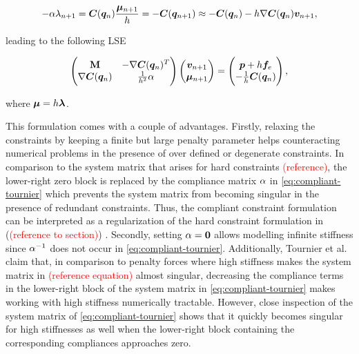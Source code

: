 \[
    -\mathbf{\alpha\lambda}_{n+1} = \bm{C}(\bm{q}_n)\frac{\bm{\mu}_{n+1}}{h} = -\bm{C}(\bm{q}_{n+1}) \approx -\bm{C}(\bm{q}_n) - h\nabla 
    \bm{C}(\bm{q}_n) \bm{v}_{n+1},
\]

\noindent leading to the following LSE \cite{tournier2015}

\begin{equation}\label{eq:compliant-tournier}
\begin{pmatrix}
    \mathbf{M} & -\nabla \bm{C}(\bm{q}_n)^T \\
    \nabla \bm{C}(\bm{q}_n) & \frac{1}{h^2}\mathbf{\alpha}
\end{pmatrix}
\begin{pmatrix}
    \bm{v}_{n+1} \\
    \bm{\mu}_{n+1}
\end{pmatrix}
=
\begin{pmatrix}
    \bm{p} + h\bm{f}_e \\
    - \frac{1}{h}\bm{C}(\bm{q}_n)
\end{pmatrix},
\end{equation}

\noindent where $\bm{\mu} = h\bm{\lambda}$.

This formulation comes with a couple of advantages. Firstly, relaxing the constraints by keeping a finite but large penalty parameter helps
counteracting numerical problems in the presence of over defined or degenerate constraints. In comparison to the system matrix that arises
for hard constraints \textcolor{red}{(reference)}, the lower-right zero block is replaced by the compliance matrix $\mathbf{\alpha}$ in 
\autoref{eq:compliant-tournier} which prevents the system matrix from becoming singular in the presence of redundant constraints. Thus, the 
compliant 
constraint formulation can be interpreted as a regularization of the hard constraint formulation in (\textcolor{red}{(reference to section)}) 
\cite{tournier2015}. Secondly, setting $\mathbf{\alpha} = \mathbf{0}$ allows modelling infinite stiffness since $\mathbf{\alpha}^{-1}$ does not occur in
\autoref{eq:compliant-tournier}. Additionally, Tournier et 
al.\ \cite{tournier2015} claim that, in comparison to penalty forces where high stiffness makes the system matrix in 
\textcolor{red}{(reference equation)} almost singular, decreasing the compliance terms in the lower-right block of the system matrix 
in \autoref{eq:compliant-tournier} makes working with high stiffness numerically tractable. However, close inspection of the system matrix of 
\autoref{eq:compliant-tournier} shows that it quickly becomes singular for high stiffnesses as well when the lower-right block containing the 
corresponding compliances approaches zero. 

